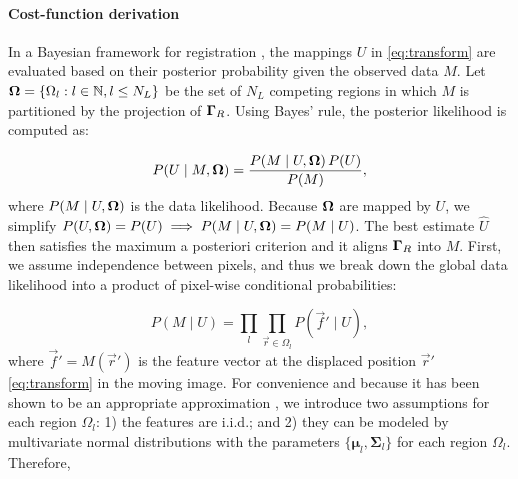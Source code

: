 \paragraph*{Cost-function derivation}
In a Bayesian framework for registration \citep{wyatt_map_2003,pohl_bayesian_2006,gass_simultaneous_2014},
  the mappings $U$ in \eqref{eq:transform} are
  evaluated based on their posterior probability given the observed data
  $M$.
Let $\boldsymbol{\Omega} = \{\Omega_l: l \in \mathbb{N}, l \leq N_L\}$ be the set of $N_L$ competing regions in
  which $M$ is partitioned by the projection of $\boldsymbol{\Gamma}_R$.
Using Bayes' rule, the posterior likelihood is computed as:

  \begin{equation}
  P(U \mid M, \boldsymbol{\Omega} ) = \frac{P(M \mid U,\boldsymbol{\Omega} )\, P(U)}{P(M)},
  \label{eq:bayes_rule}
  \end{equation}
  where $P(M \mid U,\boldsymbol{\Omega})$ is the data likelihood.
Because $\boldsymbol{\Omega}$ are mapped by $U$, we simplify
  $P(U, \boldsymbol{\Omega}) = P(U) \implies P(M \mid U,\boldsymbol{\Omega}) = P(M \mid U)$.
The best estimate $\hat{U}$ then satisfies the maximum a posteriori criterion
  \citep{bishop_pattern_2006} and it aligns $\boldsymbol{\Gamma}_R$ into $M$.
First, we assume independence between pixels, and thus we break down the
  global data likelihood into a product of pixel-wise conditional probabilities:

  \begin{equation}
  P(M \mid U) = \underset{l}{\prod} \underset{\vec{r}\in \Omega_l}{\prod}
    P\left( \vec{f}' \mid U \right),
  \label{eq:bayes_aposteriori}
  \end{equation}
  where $\vec{f}' = M(\vec{r}')$ is the feature vector at the displaced
  position $\vec{r}'$ \eqref{eq:transform} in the moving image.
For convenience and because it has been shown to be an appropriate approximation
  \citep{leemput_automated_1999a,cuadra_comparison_2005}, we introduce two assumptions for each
  region $\Omega_l$:
  1) the features are i.i.d.; and 2) they can be modeled by multivariate normal
  distributions with the parameters $\lbrace \boldsymbol{\mu}_l, \boldsymbol{\Sigma}_{l} \rbrace$
  for each region $\Omega_l$.
 Therefore,

